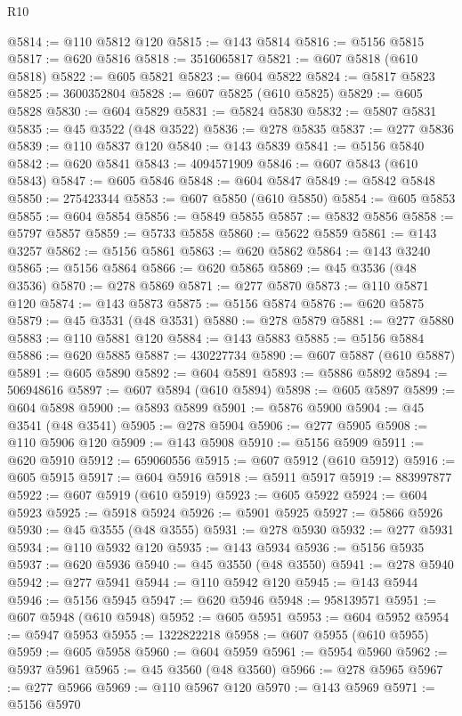 \begin{lexlean}{R10}
\begin{coremodule}
{{{{{{{{{{{{{{{{{{{{{{{{{{{{{{{{{{{{{{{{{{{{{{{{{{{{{{{{{{{{{{{{{{{{{{{{{{{{{{{{{{{{@5814 := @110 @5812 @120
@5815 := @143 @5814
@5816 := @5156 @5815
@5817 := @620 @5816
@5818 := 3516065817
@5821 := @607 @5818 (@610 @5818)
@5822 := @605 @5821
@5823 := @604 @5822
@5824 := @5817 @5823
@5825 := 3600352804
@5828 := @607 @5825 (@610 @5825)
@5829 := @605 @5828
@5830 := @604 @5829
@5831 := @5824 @5830
@5832 := @5807 @5831
@5835 := @45 @3522 (@48 @3522)
@5836 := @278 @5835
@5837 := @277 @5836
@5839 := @110 @5837 @120
@5840 := @143 @5839
@5841 := @5156 @5840
@5842 := @620 @5841
@5843 := 4094571909
@5846 := @607 @5843 (@610 @5843)
@5847 := @605 @5846
@5848 := @604 @5847
@5849 := @5842 @5848
@5850 := 275423344
@5853 := @607 @5850 (@610 @5850)
@5854 := @605 @5853
@5855 := @604 @5854
@5856 := @5849 @5855
@5857 := @5832 @5856
@5858 := @5797 @5857
@5859 := @5733 @5858
@5860 := @5622 @5859
@5861 := @143 @3257
@5862 := @5156 @5861
@5863 := @620 @5862
@5864 := @143 @3240
@5865 := @5156 @5864
@5866 := @620 @5865
@5869 := @45 @3536 (@48 @3536)
@5870 := @278 @5869
@5871 := @277 @5870
@5873 := @110 @5871 @120
@5874 := @143 @5873
@5875 := @5156 @5874
@5876 := @620 @5875
@5879 := @45 @3531 (@48 @3531)
@5880 := @278 @5879
@5881 := @277 @5880
@5883 := @110 @5881 @120
@5884 := @143 @5883
@5885 := @5156 @5884
@5886 := @620 @5885
@5887 := 430227734
@5890 := @607 @5887 (@610 @5887)
@5891 := @605 @5890
@5892 := @604 @5891
@5893 := @5886 @5892
@5894 := 506948616
@5897 := @607 @5894 (@610 @5894)
@5898 := @605 @5897
@5899 := @604 @5898
@5900 := @5893 @5899
@5901 := @5876 @5900
@5904 := @45 @3541 (@48 @3541)
@5905 := @278 @5904
@5906 := @277 @5905
@5908 := @110 @5906 @120
@5909 := @143 @5908
@5910 := @5156 @5909
@5911 := @620 @5910
@5912 := 659060556
@5915 := @607 @5912 (@610 @5912)
@5916 := @605 @5915
@5917 := @604 @5916
@5918 := @5911 @5917
@5919 := 883997877
@5922 := @607 @5919 (@610 @5919)
@5923 := @605 @5922
@5924 := @604 @5923
@5925 := @5918 @5924
@5926 := @5901 @5925
@5927 := @5866 @5926
@5930 := @45 @3555 (@48 @3555)
@5931 := @278 @5930
@5932 := @277 @5931
@5934 := @110 @5932 @120
@5935 := @143 @5934
@5936 := @5156 @5935
@5937 := @620 @5936
@5940 := @45 @3550 (@48 @3550)
@5941 := @278 @5940
@5942 := @277 @5941
@5944 := @110 @5942 @120
@5945 := @143 @5944
@5946 := @5156 @5945
@5947 := @620 @5946
@5948 := 958139571
@5951 := @607 @5948 (@610 @5948)
@5952 := @605 @5951
@5953 := @604 @5952
@5954 := @5947 @5953
@5955 := 1322822218
@5958 := @607 @5955 (@610 @5955)
@5959 := @605 @5958
@5960 := @604 @5959
@5961 := @5954 @5960
@5962 := @5937 @5961
@5965 := @45 @3560 (@48 @3560)
@5966 := @278 @5965
@5967 := @277 @5966
@5969 := @110 @5967 @120
@5970 := @143 @5969
@5971 := @5156 @5970
}}}}}}}}}}}}}}}}}}}}}}}}}}}}}}}}}}}}}}}}}}}}}}}}}}}}}}}}}}}}}}}}}}}}}}}}}}}}}}}}}}}}
\end{coremodule}
\end{lexlean}
